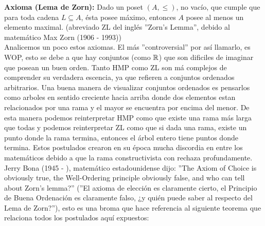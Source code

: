 \documentclass[12pt,a4paper]{book}
\begin{document}
\textbf{ Axioma (Lema de Zorn):} Dado un poset $(A,\leq)$, no vacío, que cumple que para toda cadena $L \subseteq A$, ésta posee máximo, entonces $A$ posee al menos un elemento maximal. (abreviado ZL del inglés ''Zorn's Lemma'', debido al matemático Max Zorn (1906 - 1993)) \\[0.5cm]
Analicemos un poco estos axiomas. El más ''controversial'' por así llamarlo, es WOP, esto se debe a que hay conjuntos (como $\mathbb{R}$) que son dificiles de imaginar que posean un buen orden. Tanto HMP como ZL son má complejos de comprender su verdadera escencia, ya que refieren a conjuntos ordenados arbitrarios. Una buena manera de visualizar conjuntos ordenados es pensarlos como arboles en sentido creciente hacia arriba donde dos elementos estan relacionados por una rama y el mayor se encuentra por encima del menor. De esta manera podemos reinterpretar HMP como que existe una rama más larga que todas y podemos reinterpretar ZL como que si dada una rama, existe un punto donde la rama termina, entonces el árbol entero tiene puntos donde termina. Estos postulados crearon en su época mucha discordia en entre los matemáticos debido a que la rama constructivista con rechaza profundamente. Jerry Bona (1945 - ), matemático estadounidense dijo: ''The Axiom of Choice is obviously true, the Well-Ordering principle obviously false, and who can tell about Zorn's lemma?'' (''El axioma de elección es claramente cierto, el Principio de Buena Ordenación es claramente falso, ¿y quién puede saber al respecto del Lema de Zorn?''), esto es una broma que hace referencia al siguiente teorema que relaciona todos los postulados aquí expuestos:
\end{document}
